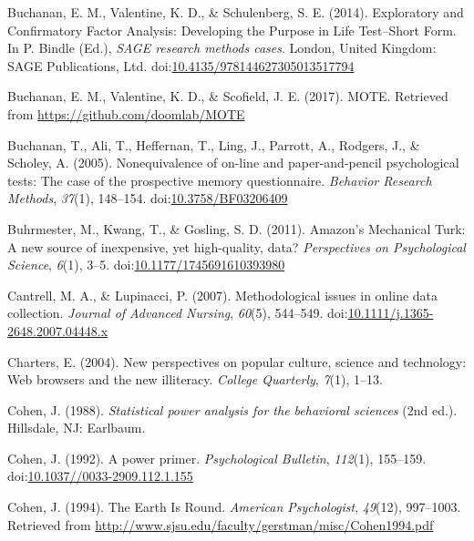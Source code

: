 \documentclass[english,man, mask]{apa6}
\theoremstyle{definition}
\theoremstyle{definition}
\theoremstyle{definition}
\theoremstyle{remark}
\begin{document}
\hypertarget{ref-Buchanan2014}{}
Buchanan, E. M., Valentine, K. D., \& Schulenberg, S. E. (2014).
Exploratory and Confirmatory Factor Analysis: Developing the Purpose in
Life Test--Short Form. In P. Bindle (Ed.), \emph{SAGE research methods
cases}. London, United Kingdom: SAGE Publications, Ltd.
doi:\href{https://doi.org/10.4135/978144627305013517794}{10.4135/978144627305013517794}

\hypertarget{ref-Buchanan2017}{}
Buchanan, E. M., Valentine, K. D., \& Scofield, J. E. (2017). MOTE.
Retrieved from \url{https://github.com/doomlab/MOTE}

\hypertarget{ref-Buchanan2005}{}
Buchanan, T., Ali, T., Heffernan, T., Ling, J., Parrott, A., Rodgers,
J., \& Scholey, A. (2005). Nonequivalence of on-line and
paper-and-pencil psychological tests: The case of the prospective memory
questionnaire. \emph{Behavior Research Methods}, \emph{37}(1), 148--154.
doi:\href{https://doi.org/10.3758/BF03206409}{10.3758/BF03206409}

\hypertarget{ref-Buhrmester2011}{}
Buhrmester, M., Kwang, T., \& Gosling, S. D. (2011). Amazon's Mechanical
Turk: A new source of inexpensive, yet high-quality, data?
\emph{Perspectives on Psychological Science}, \emph{6}(1), 3--5.
doi:\href{https://doi.org/10.1177/1745691610393980}{10.1177/1745691610393980}

\hypertarget{ref-Cantrell2007}{}
Cantrell, M. A., \& Lupinacci, P. (2007). Methodological issues in
online data collection. \emph{Journal of Advanced Nursing},
\emph{60}(5), 544--549.
doi:\href{https://doi.org/10.1111/j.1365-2648.2007.04448.x}{10.1111/j.1365-2648.2007.04448.x}

\hypertarget{ref-Charters2004}{}
Charters, E. (2004). New perspectives on popular culture, science and
technology: Web browsers and the new illiteracy. \emph{College
Quarterly}, \emph{7}(1), 1--13.

\hypertarget{ref-Cohen1988}{}
Cohen, J. (1988). \emph{Statistical power analysis for the behavioral
sciences} (2nd ed.). Hillsdale, NJ: Earlbaum.

\hypertarget{ref-Cohen1992a}{}
Cohen, J. (1992). A power primer. \emph{Psychological Bulletin},
\emph{112}(1), 155--159.
doi:\href{https://doi.org/10.1037//0033-2909.112.1.155}{10.1037//0033-2909.112.1.155}

\hypertarget{ref-Cohen1994}{}
Cohen, J. (1994). The Earth Is Round. \emph{American Psychologist},
\emph{49}(12), 997--1003. Retrieved from
\url{http://www.sjsu.edu/faculty/gerstman/misc/Cohen1994.pdf}
\end{document}

